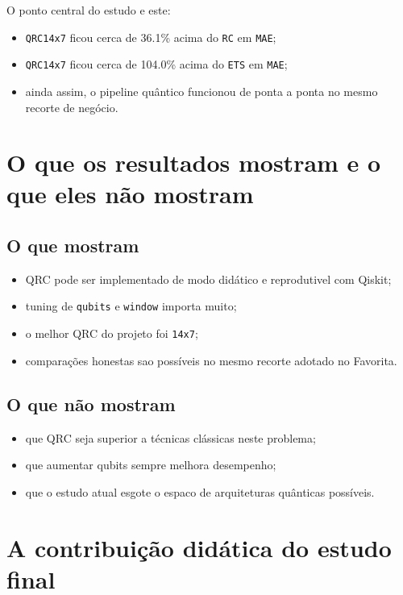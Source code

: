 \documentclass[12pt]{article}
\providecommand{\tightlist}{%
          \setlength{\itemsep}{0pt}\setlength{\parskip}{0pt}}
\begin{document}
O ponto central do estudo e este:

\begin{itemize}
\tightlist
\item
  \texttt{QRC14x7} ficou cerca de 36.1\% acima do \texttt{RC} em \texttt{MAE};
\item
  \texttt{QRC14x7} ficou cerca de 104.0\% acima do \texttt{ETS} em \texttt{MAE};
\item
  ainda assim, o pipeline quântico funcionou de ponta a ponta no mesmo recorte de negócio.
\end{itemize}

\section{O que os resultados mostram e o que eles não mostram}\label{8-o-que-os-resultados-mostram-e-o-que-eles-nuxe3o-mostram}

\subsection{O que mostram}\label{81-o-que-mostram}

\begin{itemize}
\tightlist
\item
  QRC pode ser implementado de modo didático e reprodutivel com Qiskit;
\item
  tuning de \texttt{qubits} e \texttt{window} importa muito;
\item
  o melhor QRC do projeto foi \texttt{14x7};
\item
  comparações honestas sao possíveis no mesmo recorte adotado no Favorita.
\end{itemize}

\subsection{O que não mostram}\label{82-o-que-nuxe3o-mostram}

\begin{itemize}
\tightlist
\item
  que QRC seja superior a técnicas clássicas neste problema;
\item
  que aumentar qubits sempre melhora desempenho;
\item
  que o estudo atual esgote o espaco de arquiteturas quânticas possíveis.
\end{itemize}

\section{A contribuição didática do estudo final}\label{9-a-contribuiuxe7uxe3o-diduxe1tica-do-estudo-final}
\end{document}
